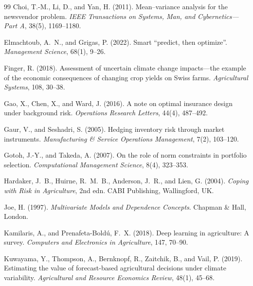 \documentclass[12pt,review,authoryear]{elsarticle}
\numberwithin{equation}{section}
\begin{document}
\begin{thebibliography}{99}
Choi, T.-M., Li, D., and Yan, H. (2011).
\newblock Mean--variance analysis for the newsvendor problem.
\newblock \emph{IEEE Transactions on Systems, Man, and Cybernetics---Part A}, 38(5), 1169--1180.

Elmachtoub, A.~N., and Grigas, P. (2022).
\newblock Smart ``predict, then optimize''.
\newblock \emph{Management Science}, 68(1), 9--26.

Finger, R. (2018).
\newblock Assessment of uncertain climate change impacts---the example of the economic consequences of changing crop yields on Swiss farms.
\newblock \emph{Agricultural Systems}, 108, 30--38.

Gao, X., Chen, X., and Ward, J. (2016).
\newblock A note on optimal insurance design under background risk.
\newblock \emph{Operations Research Letters}, 44(4), 487--492.

Gaur, V., and Seshadri, S. (2005).
\newblock Hedging inventory risk through market instruments.
\newblock \emph{Manufacturing \& Service Operations Management}, 7(2), 103--120.

Gotoh, J.-Y., and Takeda, A. (2007).
\newblock On the role of norm constraints in portfolio selection.
\newblock \emph{Computational Management Science}, 8(4), 323--353.

Hardaker, J.~B., Huirne, R.~M.~B., Anderson, J.~R., and Lien, G. (2004).
\newblock \emph{Coping with Risk in Agriculture}, 2nd edn.
\newblock CABI Publishing, Wallingford, UK.

Joe, H. (1997).
\newblock \emph{Multivariate Models and Dependence Concepts}.
\newblock Chapman \& Hall, London.

Kamilaris, A., and Prenafeta-Bold\'{u}, F.~X. (2018).
\newblock Deep learning in agriculture: A survey.
\newblock \emph{Computers and Electronics in Agriculture}, 147, 70--90.

Kuwayama, Y., Thompson, A., Bernknopf, R., Zaitchik, B., and Vail, P. (2019).
\newblock Estimating the value of forecast-based agricultural decisions under climate variability.
\newblock \emph{Agricultural and Resource Economics Review}, 48(1), 45--68.


\end{thebibliography}
\end{document}
